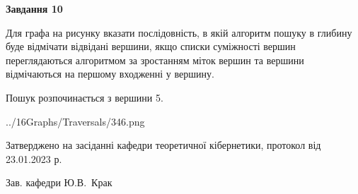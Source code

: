 \documentclass[12pt, ukrainian]{article}
\begin{document}
{\begin {large}
{\begin {center}\textbf{Завдання 10}\end {center}}\par
Для графа на рисунку вказати послідовність, в якій алгоритм пошуку в глибину буде відмічати відвідані вершини, якщо списки суміжності вершин переглядаються алгоритмом за зростанням міток вершин та вершини відмічаються на першому вход\-женні у вершину.\par
Пошук розпочинається з вершини 5.\par

\begin{center}
	{../16Graphs/Traversals/346.png}
\end{center}\par
\newpage


\end {large}
}
{\smallskip \begin {small} Затверджено на засіданні кафедри теоретичної кібернетики, протокол  від   23.01.2023 р.\par\smallskip\smallskip
{\parbox {6.5 cm}{Зав. кафедри \dotfill Ю.В.~Крак}} \end{small}}
\end{document}
